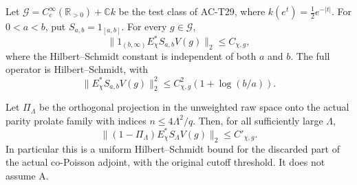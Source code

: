 \begin{theorem}
\label{AC-T33}
Let \(\mathscr G=C_c^\infty(\mathbb R_{>0})+\mathbb Ck\)
be the test class of AC-T29, where
\(k(e^t)=\tfrac12e^{-|t|}\).
For \(0<a<b\), put \(S_{a,b}=1_{[a,b]}\).
For every \(g\in\mathscr G\),
\[
 \bigl\|1_{(b,\infty)}E_\chi^*S_{a,b}V(g)\bigr\|_2
                   \leq C_{\chi,g},
 \tag{TB.74}
\]
where the Hilbert--Schmidt constant is independent of both
\(a\) and \(b\).
The full operator is Hilbert--Schmidt, with
\[
       \|E_\chi^*S_{a,b}V(g)\|_2^2
                   \leq C_{\chi,g}^2(1+\log(b/a)).
 \tag{TB.75}
\]

Let \(\Pi_\Lambda\) be the orthogonal projection in the
unweighted raw space onto the actual parity prolate family
with indices \(n\leq4\Lambda^2/q\).
Then, for all sufficiently large \(\Lambda\),
\[
 \bigl\|(1-\Pi_\Lambda)
               E_\chi^*S_\Lambda V(g)\bigr\|_2
                     \leq C'_{\chi,g}.
 \tag{TB.76}
\]
In particular this is a uniform Hilbert--Schmidt bound
for the discarded part of the actual co-Poisson adjoint,
with the original cutoff threshold.
It does not assume A.
\end{theorem}
